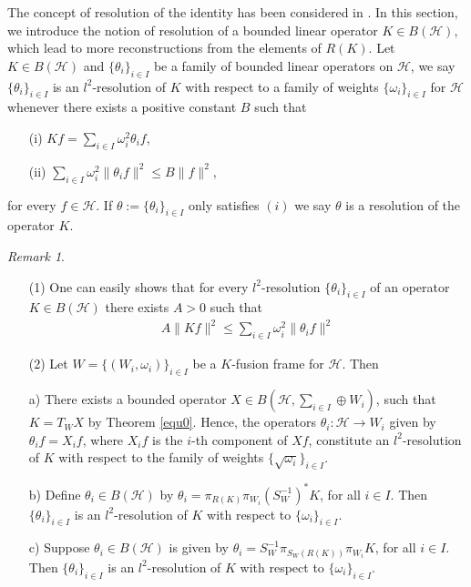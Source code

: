 \documentclass{birkjour}
\theoremstyle{definition}
\theoremstyle{remark}
\newtheorem{rem}[thm]{Remark}
\numberwithin{equation}{section}
\begin{document}
The concept of  resolution of the identity has been considered in \cite{ Cas04, khosravi15}. In this section,  we introduce the notion of resolution of a bounded linear operator $K\in B(\mathcal{H})$, which lead to more reconstructions from the elements of  $R(K)$.
\smallskip
\goodbreak
Let $K\in B(\mathcal{H})$ and $\{\theta_{i}\}_{i\in I}$ be  a family of bounded linear operators  on $\mathcal{H}$, we say $\{\theta_{i}\}_{i\in I}$ is an  $l^{2}$-resolution of  $K$  with  respect to  a family of weights $\{\omega_{i}\}_{i\in I}$ for $\mathcal{H}$   whenever there exists a positive constant $B$ such that
\begin{itemize}
\item[(i)] $Kf = \sum_{i\in I}\omega_{i}^{2}\theta_{i}f$,
\item[(ii)] $\sum_{i\in I}\omega_i^2\|\theta_{i}f\|^2\leq B\|f\|^{2}$,
\end{itemize}
for every $f\in \mathcal{H}$.
If $\theta := \{\theta_{i}\}_{i\in I}$ only  satisfies $(i)$ we say $\theta$ is a resolution of the operator $K$.
\begin{rem}\label{cons. l-reso1}
\begin{itemize}


\item[(1)] One can easily shows that for every $l^{2}$-resolution $\{\theta_{i}\}_{i\in I}$ of an operator  $K\in  B(\mathcal{H})$ there exists $A>0$ such that
\begin{eqnarray*}
A\|Kf\|^{2}\leq \sum_{i\in I}\omega_i^2\|\theta_{i}f\|^2
\end{eqnarray*}
\item[(2)] Let  $W=\lbrace
(W_{i},\omega_{i})\rbrace_{i\in I}$ be a $K$-fusion frame  for $\mathcal{H}$. Then

\item[a)]   There exists a bounded operator $X\in B(\mathcal{H},  \sum_{i\in
I}\oplus W_{i} )$, such that $K = T_{W}X$ by Theorem \ref{equ0}. Hence, the operators   $\theta_{i}: \mathcal{H}\rightarrow W_{i}$  given by  $\theta_{i}f = X_{i}f$, where $X_{i}f$ is the $i$-th component of $Xf$, constitute an $l^{2}$-resolution of  $K$ with  respect to  the family of weights $\{\sqrt{\omega_{i}}\}_{i\in I}$.
\item[b)] Define $\theta_{i}\in B(\mathcal{H})$ by $\theta_{i} = \pi_{R(K)}\pi_{W_{i}}(S_{W}^{-1})^{*}K$, for all $i\in I$. Then $\{\theta_{i}\}_{i\in I}$ is an  $l^{2}$-resolution of  $K$ with  respect to $\{\omega_{i}\}_{i\in I}$.
\item[c)]Suppose $\theta_{i}\in B(\mathcal{H})$ is given by $\theta_{i} = S_{W}^{-1}\pi_{S_{W}(R(K))}\pi_{W_{i}}K$, for all $i\in I$. Then $\{\theta_{i}\}_{i\in I}$   is an  $l^{2}$-resolution of  $K$ with  respect to   $\{\omega_{i}\}_{i\in I}$.
\end{itemize}
\end{rem}
\end{document}
